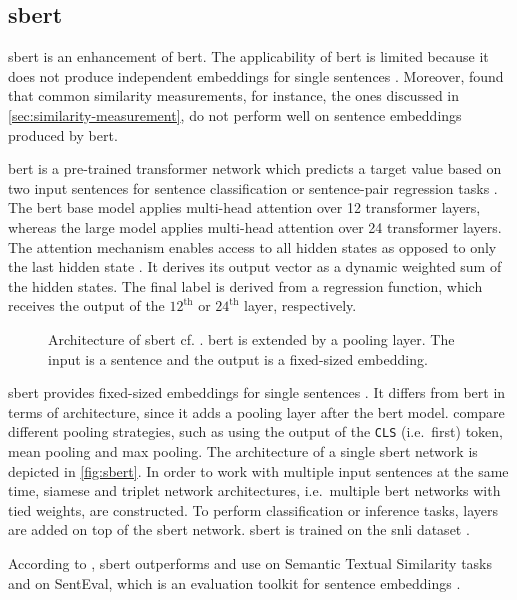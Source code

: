 \subsection{\acl*{sbert}}\label{subsec:hf-sent-ransformers}

\acf{sbert} is an enhancement of \ac{bert}.
The applicability of \ac{bert} is limited because it does not produce independent embeddings for single sentences \cite{HfsentTrans2019}.
Moreover, \citeauthor{HfsentTrans2019} found that common similarity measurements, for instance, the ones discussed in \autoref{sec:similarity-measurement}, 
do not perform well on sentence embeddings produced by \ac{bert}.

\ac{bert} is a pre-trained transformer network which 
predicts a target value based on two input sentences for sentence classification or sentence-pair regression tasks \cite{HfsentTrans2019}.
The \ac{bert} base model applies multi-head attention over 12 transformer layers, whereas the large model applies multi-head attention over 24 transformer layers.
The attention mechanism enables access to all hidden states as opposed to only the last hidden state \cite{attention_book2023}.
It derives its output vector as a dynamic weighted sum of the hidden states.
The final label is derived from a regression function, which receives the output of the $12^\text{th}$ or $24^\text{th}$ layer, respectively.

\begin{figure}[!htp] %
    \centering
    
    \caption[Architecture of \acs*{sbert}]{Architecture of \acs*{sbert} cf. \cite{HfsentTrans2019}.
    \acs*{bert} is extended by a pooling layer.
    The input is a sentence and the output is a fixed-sized embedding.
    }
    \label{fig:sbert}
\end{figure}

\ac{sbert} provides fixed-sized embeddings for single sentences \cite{HfsentTrans2019}.
It differs from \ac{bert} in terms of architecture, since it adds a pooling layer after the \ac{bert} model.
\citeauthor{HfsentTrans2019} compare different pooling strategies, such as using the output of the \texttt{CLS} (i.e.\ first) token, mean pooling and max pooling.
The architecture of a single \ac{sbert} network is depicted in \autoref{fig:sbert}.
In order to work with multiple input sentences at the same time, siamese and triplet network architectures, 
i.e.\ multiple \ac{bert} networks with tied weights, are constructed.
To perform classification or inference tasks, layers are added on top of the \ac{sbert} network.
\ac{sbert} is trained on the \ac{snli} dataset \cite{HfsentTrans2019, snli_dataset}.

According to \citeauthor{HfsentTrans2019}, \ac{sbert} outperforms \infersent{} and \ac{use} on Semantic Textual Similarity tasks 
and on SentEval, which is an evaluation toolkit for sentence embeddings \cite{HfsentTrans2019}.

